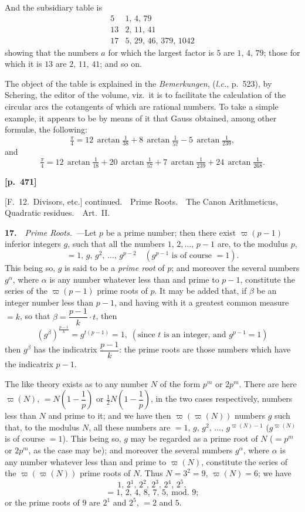 \documentclass[11pt,a4paper]{article}
\providecommand{\totient}{\varpi}
\begin{document}
And the subsidiary table is
\[
\begin{array}{c|l}
 5 & 1,\,4,\,79 \\
13 & 2,\,11,\,41 \\
17 & 5,\,29,\,46,\,379,\,1042
\end{array}
\]
showing that the numbers $a$ for which the largest factor is $5$ are $1,\,4,\,79$; those for which it is $13$ are $2,\,11,\,41$; and so on.

The object of the table is explained in the \textit{Bemerkungen}, (\textit{l.c.}, p.~523), by Schering, the editor of the volume, viz.\ it is to facilitate the calculation of the circular arcs the cotangents of which are rational numbers.   To take a simple example, it appears to be by means of it that Gauss obtained, among other formul\ae, the following:
\[
\tfrac{\pi}{4} = 12\,\arctan\tfrac{1}{38} + 8\,\arctan\tfrac{1}{57} - 5\,\arctan\tfrac{1}{239},
\]
and
\[
\tfrac{\pi}{4} = 12\,\arctan\tfrac{1}{18} + 20\,\arctan\tfrac{1}{57} + 7\,\arctan\tfrac{1}{239} + 24\,\arctan\tfrac{1}{268}.
\]

\bigskip
\noindent\textbf{[p.~471]}\quad
\begin{center}
[F.~12.\ Divisors, etc.] continued.\ \ Prime Roots.\ \ The Canon Arithmeticus, Quadratic residues.\ \ Art.~II.
\end{center}

\textbf{17.}\ \ \textit{Prime Roots.}\ ---Let $p$ be a prime number; then there exist $\totient(p-1)$ inferior integers $g$, such that all the numbers $1,\,2,\ldots,\,p-1$ are, to the modulus $p$,
\[
=1,\,g,\,g^2,\,\ldots,\,g^{p-2}\quad(g^{p-1}\text{ is of course }=1).
\]
This being so, $g$ is said to be a \textit{prime root} of $p$; and moreover the several numbers $g^\alpha$, where $\alpha$ is any number whatever less than and prime to $p-1$, constitute the series of the $\totient(p-1)$ prime roots of $p$.   It may be added that, if $\beta$ be an integer number less than $p-1$, and having with it a greatest common measure $=k$, so that $\beta=\dfrac{p-1}{k}\cdot t$, then
\[
(g^\beta)^{\frac{p-1}{k}} = g^{t(p-1)} = 1,\;(\text{since $t$ is an integer, and }g^{p-1}=1)
\]
then $g^\beta$ has the indicatrix $\dfrac{p-1}{k}$: the prime roots are those numbers which have the indicatrix $p-1$.

The like theory exists as to any number $N$ of the form $p^m$ or $2p^m$.   There are here $\totient(N),\,=N\!\left(1-\dfrac{1}{p}\right)$ or $\tfrac{1}{2}N\!\left(1-\dfrac{1}{p}\right)$, in the two cases respectively, numbers less than $N$ and prime to it; and we have then $\totient\!\left(\totient(N)\right)$ numbers $g$ such that, to the modulus $N$, all these numbers are $=1,\,g,\,g^2,\,\ldots,\,g^{\totient(N)-1}$ ($g^{\totient(N)}$ is of course $=1$).   This being so, $g$ may be regarded as a prime root of $N$ ($=p^m$ or $2p^m$, as the case may be); and moreover the several numbers $g^\alpha$, where $\alpha$ is any number whatever less than and prime to $\totient(N)$, constitute the series of the $\totient(\totient(N))$ prime roots of $N$.   Thus $N=3^2=9$, $\totient(N)=6$; we have
\[
1,\,2^1,\,2^2,\,2^3,\,2^4,\,2^5,
\]
\[
=1,\,2,\,4,\,8,\,7,\,5,\ \text{mod.\ 9};
\]
or the prime roots of $9$ are $2^1$ and $2^5$, $=2$ and $5$.
\end{document}
